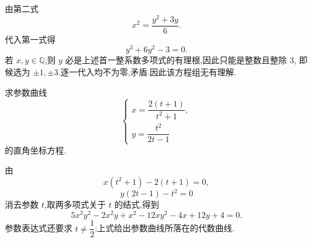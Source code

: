\begin{solution}
由第二式
\[
  x^2=\dfrac{y^2+3y}{6}.
\]
代入第一式得
\[
  y^3+6y^2-3=0.
\]
若 $x,y\in\mathbb{Q}$,则 $y$ 必是上述首一整系数多项式的有理根,因此只能是整数且整除 $3$,
即候选为 $\pm1,\pm3$.逐一代入均不为零,矛盾.因此该方程组无有理解.
\end{solution}

\begin{example}
求参数曲线
\[
\begin{cases}
  x=\dfrac{2(t+1)}{t^2+1},\\[1ex]
  y=\dfrac{t^2}{2t-1}
\end{cases}
\]
的直角坐标方程.
\end{example}
\exampleblank

\begin{solution}
由
\[
  x(t^2+1)-2(t+1)=0,
\]
\[
  y(2t-1)-t^2=0
\]
消去参数 $t$,取两多项式关于 $t$ 的结式,得到
\[
\boxed{
  5x^2y^2-2x^2y+x^2-12xy^2-4x+12y+4=0.}
\]
参数表达式还要求 $t\ne\dfrac12$;上式给出参数曲线所落在的代数曲线.
\end{solution}
